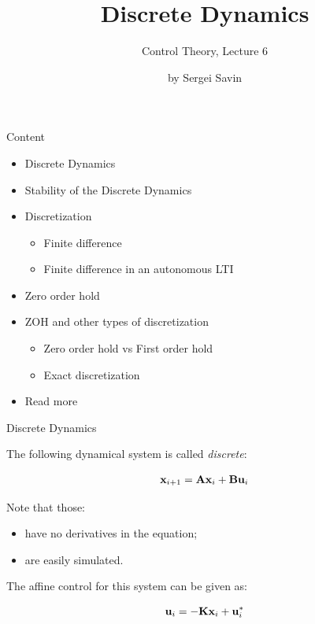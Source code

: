 \documentclass{beamer}
\title{Discrete Dynamics}
\subtitle{Control Theory, Lecture 6}
\author{by Sergei Savin}
\date{\mydate}
\begin{document}
\maketitle


\begin{frame}{Content}

\begin{itemize}
\item Discrete Dynamics
\item Stability of the Discrete Dynamics
\item Discretization
\begin{itemize}
    \item Finite difference
    \item Finite difference in an autonomous LTI
\end{itemize}
\item Zero order hold
\item ZOH and other types of discretization
\begin{itemize}
    \item Zero order hold vs First order hold
    \item Exact discretization
\end{itemize}
\item Read more
\end{itemize}

\end{frame}





\begin{frame}{Discrete Dynamics}
\begin{flushleft}

The following dynamical system is called \emph{discrete}:

\begin{equation}
    \mathbf{x}_{i+1} = \mathbf{A}\mathbf{x}_i + \mathbf{B}\mathbf{u}_i
\end{equation}

Note that those:

\begin{itemize}
    \item have no derivatives in the equation;
    \item are easily simulated.
\end{itemize}

\bigskip

The affine control for this system can be given as:

\begin{equation}
    \mathbf{u}_i = -\mathbf{K}\mathbf{x}_i + \mathbf{u}_i^*
\end{equation}

\end{flushleft}
\end{frame}
\end{document}
